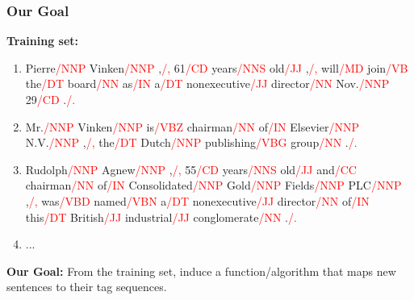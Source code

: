 \documentclass[handout]{beamer}
\begin{document}
\begin{frame}
  \frametitle{Our Goal}
  \textbf{Training set:}
  \begin{enumerate}
    \item Pierre\textcolor{red}{/NNP} Vinken\textcolor{red}{/NNP} ,\textcolor{red}{/,} 61\textcolor{red}{/CD} years\textcolor{red}{/NNS} old\textcolor{red}{/JJ} ,\textcolor{red}{/,} will\textcolor{red}{/MD} join\textcolor{red}{/VB} the\textcolor{red}{/DT} board\textcolor{red}{/NN} as\textcolor{red}{/IN} a\textcolor{red}{/DT} nonexecutive\textcolor{red}{/JJ} director\textcolor{red}{/NN} Nov.\textcolor{red}{/NNP} 29\textcolor{red}{/CD} .\textcolor{red}{/.}
    \item Mr.\textcolor{red}{/NNP} Vinken\textcolor{red}{/NNP} is\textcolor{red}{/VBZ} chairman\textcolor{red}{/NN} of\textcolor{red}{/IN} Elsevier\textcolor{red}{/NNP} N.V.\textcolor{red}{/NNP} ,\textcolor{red}{/,} the\textcolor{red}{/DT} Dutch\textcolor{red}{/NNP} publishing\textcolor{red}{/VBG} group\textcolor{red}{/NN} .\textcolor{red}{/.}
    \item Rudolph\textcolor{red}{/NNP} Agnew\textcolor{red}{/NNP} ,\textcolor{red}{/,} 55\textcolor{red}{/CD} years\textcolor{red}{/NNS} old\textcolor{red}{/JJ} and\textcolor{red}{/CC} chairman\textcolor{red}{/NN} of\textcolor{red}{/IN} Consolidated\textcolor{red}{/NNP} Gold\textcolor{red}{/NNP} Fields\textcolor{red}{/NNP} PLC\textcolor{red}{/NNP} ,\textcolor{red}{/,} was\textcolor{red}{/VBD} named\textcolor{red}{/VBN} a\textcolor{red}{/DT} nonexecutive\textcolor{red}{/JJ} director\textcolor{red}{/NN} of\textcolor{red}{/IN} this\textcolor{red}{/DT} British\textcolor{red}{/JJ} industrial\textcolor{red}{/JJ} conglomerate\textcolor{red}{/NN} .\textcolor{red}{/.}
    \item ...
  \end{enumerate}

  \textbf{Our Goal:} From the training set, induce a function/algorithm that maps new sentences to their tag sequences.
\end{frame}
\end{document}
